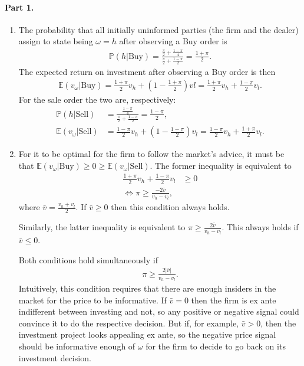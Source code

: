 \begin{solution}
	\paragraph{Part 1.}
	\begin{enumerate}[label=(\alph{enumi})]
		\item 
		The probability that all initially uninformed parties (the firm and the dealer) assign to state being $\omega = h$ after observing a Buy order is
		\begin{align*}
			\mathbb{P}(h | \text{Buy}) = \frac{\frac{\pi}{2} + \frac{1-\pi}{4}}{\frac{\pi}{2} + \frac{1-\pi}{2}} = \frac{1 + \pi}{2}.
		\end{align*}
		The expected return on investment after observing a Buy order is then
		\begin{align*}
			\mathbb{E}(v_\omega | \text{Buy} ) = \frac{1+\pi}{2} v_h + \left(1 - \frac{1+\pi}{2} \right) vl = \frac{1+\pi}{2} v_h + \frac{1-\pi}{2} v_l.
		\end{align*}
		For the sale order the two are, respectively:
		\begin{align*}
			\mathbb{P}(h | \text{Sell}) &= \frac{\frac{1-\pi}{4}}{\frac{\pi}{2} + \frac{1-\pi}{2}} = \frac{1 - \pi}{2},
			\\
			\mathbb{E}(v_\omega | \text{Sell} ) &= \frac{1-\pi}{2} v_h + \left(1 - \frac{1-\pi}{2} \right) v_l = \frac{1-\pi}{2} v_h + \frac{1+\pi}{2} v_l.
		\end{align*}
	
		\item
		For it to be optimal for the firm to follow the market's advice, it must be that $\mathbb{E}(v_\omega | \text{Buy} ) \geq 0 \geq \mathbb{E}(v_\omega | \text{Sell} )$.
		The former inequality is equivalent to
		\begin{align*}
			\frac{1+\pi}{2} v_h + \frac{1-\pi}{2} v_l &\geq 0
			\\
			\iff
			\pi \geq \frac{-2 \bar{v}}{v_h - v_l},
		\end{align*}
		where $\bar{v} = \frac{v_h+v_l}{2}$. If $\bar{v} \geq 0$ then this condition always holds.
		
		Similarly, the latter inequality is equivalent to $\pi \geq \frac{2 \bar{v}}{v_h - v_l}$. This always holds if $\bar{v} \leq 0$. 
		
		Both conditions hold simultaneously if
		\begin{align}
			\pi \geq \frac{2 |\bar{v}|}{v_h - v_l}.
			\tag{$\star$}
			\label{eq:fbexist}
		\end{align}
		Intuitively, this condition requires that there are enough insiders in the market for the price to be informative. If $\bar{v}=0$ then the firm is ex ante indifferent between investing and not, so any positive or negative signal could convince it to do the respective decision. But if, for example, $\bar{v} > 0$, then the investment project looks appealing ex ante, so the negative price signal should be informative enough of $\omega$ for the firm to decide to go back on its investment decision.
		

\end{enumerate}
\end{solution}
